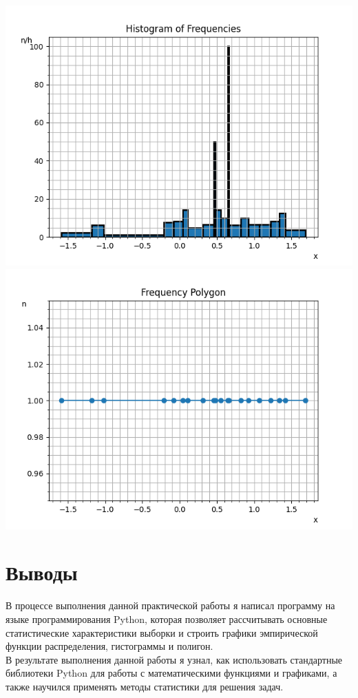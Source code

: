 \documentclass[12pt,one column]{article}
\begin{document}
\includegraphics[width=\textwidth]{plot2.png}
\includegraphics[width=\textwidth]{plot3.png}

\section{Выводы}
В процессе выполнения данной практической работы я написал программу на языке программирования Python, которая позволяет рассчитывать основные статистические характеристики выборки и строить графики эмпирической функции распределения, гистограммы и полигон.\\

В результате выполнения данной работы я узнал, как использовать стандартные библиотеки Python для работы с математическими функциями и графиками, а также научился применять методы статистики для решения задач.
\end{document}
